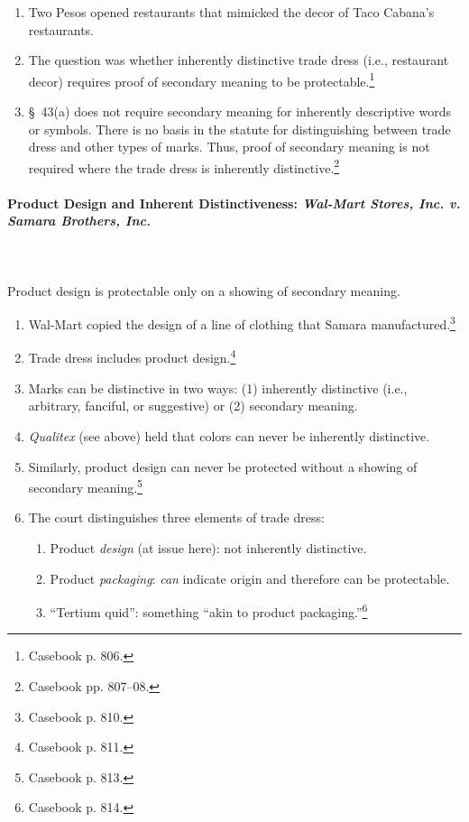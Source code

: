 \begin{enumerate}
    \item Two Pesos opened restaurants that mimicked the decor of Taco 
    Cabana's restaurants.
    \item The question was whether inherently distinctive trade dress (i.e., 
    restaurant decor) requires proof of secondary meaning to be 
    protectable.\footnote{Casebook p. 806.}
    \item \S\ 43(a) does not require secondary meaning for inherently 
    descriptive words or symbols. There is no basis in the statute for 
    distinguishing between trade dress and other types of marks. Thus, proof 
    of secondary meaning is not required where the trade dress is inherently 
    distinctive.\footnote{Casebook pp. 807--08.}
\end{enumerate}

\paragraph{Product Design and Inherent Distinctiveness: \emph{Wal-Mart Stores, 
Inc. v. Samara Brothers, Inc.}}
~\\\\
Product design is protectable only on a showing of secondary meaning.

\begin{enumerate}
    \item Wal-Mart copied the design of a line of clothing that Samara 
    manufactured.\footnote{Casebook p. 810.}
    \item Trade dress includes product design.\footnote{Casebook p. 811.}
    \item Marks can be distinctive in two ways: (1) inherently distinctive 
    (i.e., arbitrary, fanciful, or suggestive) or (2) secondary meaning.
    \item \emph{Qualitex} (see above) held that colors can never be inherently 
    distinctive.
    \item Similarly, product design can never be protected without a showing 
    of secondary meaning.\footnote{Casebook p. 813.}
    \item The court distinguishes three elements of trade dress:
    \begin{enumerate}
        \item Product \emph{design} (at issue here): not inherently 
        distinctive.
        \item Product \emph{packaging}: \emph{can} indicate origin and 
        therefore can be protectable.
        \item ``Tertium quid'': something ``akin to product 
        packaging.''\footnote{Casebook p. 814.}
    \end{enumerate}
\end{enumerate}

